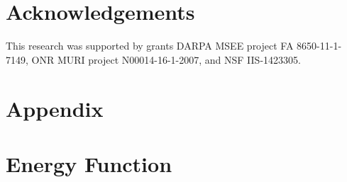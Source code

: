 \documentclass[10pt,twocolumn,letterpaper]{article}
\begin{document}
\section*{Acknowledgements}
This research was supported by grants DARPA MSEE project FA 8650-11-1-7149, ONR MURI project N00014-16-1-2007, and NSF IIS-1423305.

{\small


}

\appendix
\section*{Appendix}

\section{Energy Function}
\end{document}
